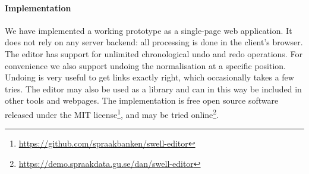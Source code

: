 \documentclass[10pt, a4paper]{article}
\begin{document}




\paragraph{Implementation}
We have implemented a working prototype as a single-page web application.
It does not rely on any server backend: all processing is done in the
client's browser.
The editor has support for unlimited chronological undo and redo operations.
For convenience we also support undoing the normalisation at a specific position.
Undoing is very useful to get links exactly right, which occasionally takes a
few tries.
The editor may also be used as a library and can in this way
be included in other tools and webpages.
The implementation is free open source software released under the
MIT license\footnote{\scriptsize\url{https://github.com/spraakbanken/swell-editor}},
and may be tried online\footnote{\scriptsize\url{https://demo.spraakdata.gu.se/dan/swell-editor}}.
\end{document}
